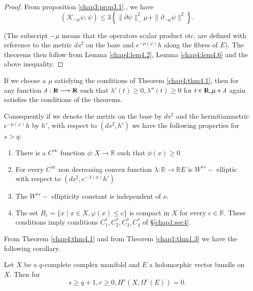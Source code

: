  \begin{proof}
   From proposition \ref{chap3:prop3.1}., we have
   $$ 
   (\mathcal{K}_{-\mu} \psi ,\psi) \leq 3 \left\{ \|
   \overline{\partial}\psi \|^2_-\mu  + \| \vartheta _{-\mu} \psi
   \|^2\right\}.  
   $$

(The subscript $-\mu$ means that the operators scalar product etc. are
   defined  with reference to the metric $ds^2$ on the base and
   $e^{-\mu (\varphi)}h$ along the fibres of $E$). The theorems then
   follow from Lemma \ref{chap4:lem4.2}, Lemma \ref{chap4:lem4.6} and
   the above inequality.  
 \end{proof}

\begin{remark*}
  If we choose a $\mu$ satisfying the conditions of Theorem \ref{chap4:thm4.1}, then
  for any function $\lambda : \varmathbb{R}\longrightarrow
  \varmathbb{R}$ such that $\lambda'(t) \geq 0, \lambda''(t) \geq 0$
  for $t \in \varmathbb{R}, \mu + \lambda$  again satisfies the
  conditions of the theorems. 
\end{remark*}

Consequently if we denote the metric on the base by $ds^2$ and the
hermitian\pageoriginale metric $e^{-\mu (\varphi)}h$ by $h'$, with
respect to $(ds^2 , h')$ we have the following properties for $s > q$:  
\begin{enumerate}[1)]
\item There is a $C^\infty$ function $\phi : X \to
  \mathbb{R}$ such that $\phi(x) \geq 0$ 

\item For every $C^\infty$ non decreasing convex function $\lambda
  :\mathbb{R} \rightarrow  \mathbb{R} E$ is $W^{rs}-$
  elliptic with respect to $(ds^2 , e^{-\lambda(\phi)}h')$ 

\item The $W^{rs}-$ ellipticity constant is independent of $\nu$.

\item The set $B_c=\{ x \mid x \in X, \varphi (x) \leq c\}$ is compact
  in $X$ for every $c \in \mathbb{R}$. These conditions imply
  conditions $C^*_1, C^*_2, C^*_3, C^*_4$ of \S \ref{chap1:sec4}. 
\end{enumerate}

From Theorem \ref{chap4:thm4.1} and from Theorem \ref{chap1:thm1.3} we
have the following corollary. 

\begin{theorem}\label{chap4:thm4.2}%
  Let $X$ be a $q$-complete complex manifold and $E$ a holomorphic vector
  bundle on $X$. Then for 
  $$
  s \geq q+1, r \geq 0, H^s(X, \Omega^r (E)) = 0.
  $$
\end{theorem}

